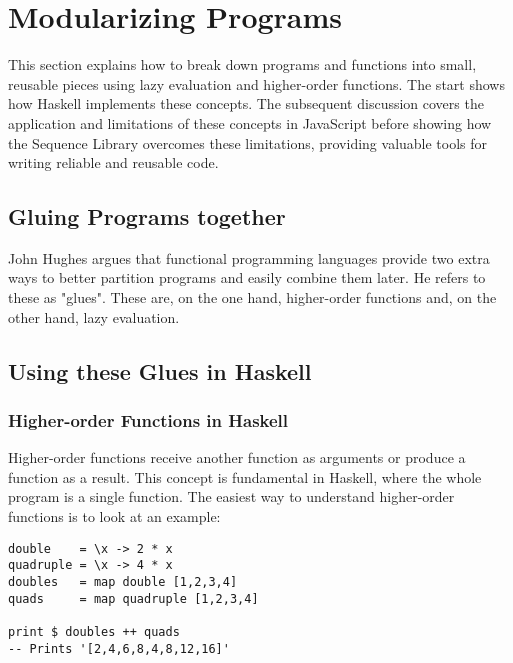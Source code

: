 \section{Modularizing Programs}
\label{sec:Modularizing Programs}
This section explains how to break down programs and functions into small,
reusable pieces using lazy evaluation and higher-order functions. The start
shows how Haskell implements these concepts. The subsequent discussion covers
the application and limitations of these concepts in JavaScript before showing
how the Sequence Library overcomes these limitations, providing valuable tools
for writing reliable and reusable code.

\subsection{Gluing Programs together} %
\label{sub:Gluing Programs together}
John Hughes argues that functional programming languages provide two extra ways
to better partition programs and easily combine them later. He refers to these
as "glues". These are, on the one hand, higher-order functions and, on the
other hand, lazy evaluation. \cite[p.3]{hughes_why_1989}

\subsection{Using these Glues in Haskell} %
\label{sub:Using these Glues in Haskel}

\subsubsection{Higher-order Functions in Haskell} %
\label{subsub:Higher-order functions Haskell}
Higher-order functions receive another function as arguments or produce a
function as a result. This concept is fundamental in Haskell, where the whole
program is a single function. The easiest way to understand higher-order
functions is to look at an example:

\begin{lstlisting}[style=Haskell, 
                  caption=Higher-order functions in Haskell, 
                  label={lst:hof_haskell}
]
double    = \x -> 2 * x
quadruple = \x -> 4 * x
doubles   = map double [1,2,3,4]
quads     = map quadruple [1,2,3,4]

print $ doubles ++ quads
-- Prints '[2,4,6,8,4,8,12,16]'
\end{lstlisting}

